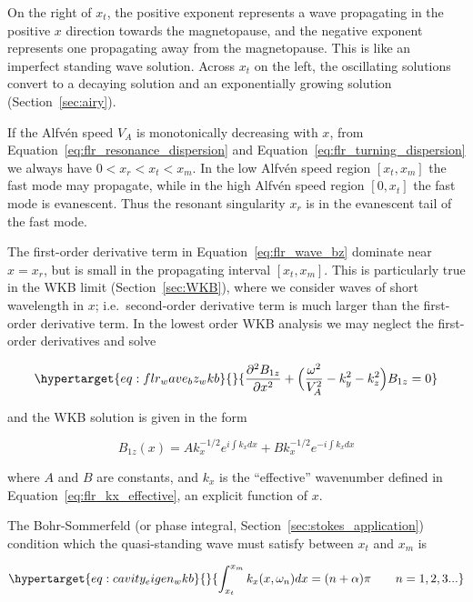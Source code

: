 \documentclass[
  notoc %
]{tufte-book}
\begin{document}
On the right of \(x_t\), the positive exponent represents a wave
propagating in the positive \(x\) direction towards the magnetopause,
and the negative exponent represents one propagating away from the
magnetopause. This is like an imperfect standing wave solution. Across
\(x_t\) on the left, the oscillating solutions convert to a decaying
solution and an exponentially growing solution (Section~\ref{sec:airy}).

If the Alfvén speed \(V_A\) is monotonically decreasing with \(x\), from
Equation~\ref{eq:flr_resonance_dispersion} and
Equation~\ref{eq:flr_turning_dispersion} we always have
\(0 < x_r < x_t < x_m\). In the low Alfvén speed region \([x_t, x_m]\)
the fast mode may propagate, while in the high Alfvén speed region
\([0, x_t]\) the fast mode is evanescent. Thus the resonant singularity
\(x_r\) is in the evanescent tail of the fast mode.

The first-order derivative term in Equation~\ref{eq:flr_wave_bz}
dominate near \(x=x_r\), but is small in the propagating interval
\([x_t, x_m]\). This is particularly true in the WKB limit
(Section~\ref{sec:WKB}), where we consider waves of short wavelength in
\(x\); i.e.~second-order derivative term is much larger than the
first-order derivative term. In the lowest order WKB analysis we may
neglect the first-order derivatives and solve

\begin{equation}\protect\hypertarget{eq:flr_wave_bz_wkb}{}{
\frac{\partial^2 B_{1z}}{\partial x^2} + \Big( \frac{\omega^2}{V_A^2} - k_y^2 - k_z^2 \Big) B_{1z} = 0
}\label{eq:flr_wave_bz_wkb}\end{equation}

and the WKB solution is given in the form

\[
B_{1z}(x) = A k_x^{-1/2} e^{i\int k_x dx} + B k_x^{-1/2}e^{-i\int k_x dx}
\]

where \(A\) and \(B\) are constants, and \(k_x\) is the ``effective''
wavenumber defined in Equation~\ref{eq:flr_kx_effective}, an explicit
function of \(x\).

The Bohr-Sommerfeld (or phase integral,
Section~\ref{sec:stokes_application}) condition which the quasi-standing
wave must satisfy between \(x_t\) and \(x_m\) is

\begin{equation}\protect\hypertarget{eq:cavity_eigen_wkb}{}{
\int_{x_t}^{x_m} k_x(x,\omega_n) dx = (n+\alpha)\pi\qquad n = 1,2,3...
}\label{eq:cavity_eigen_wkb}\end{equation}
\end{document}
